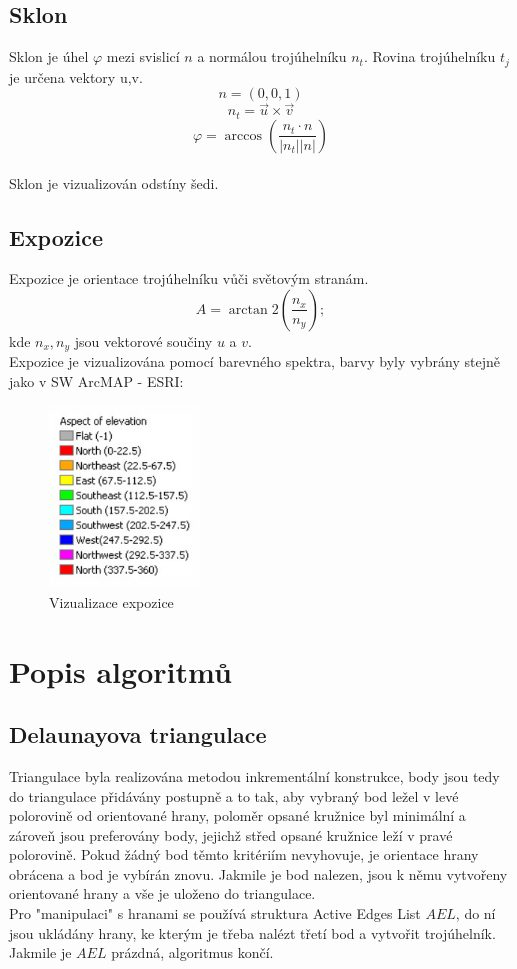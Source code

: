 \documentclass[a4paper, 12pt]{article}
\begin{document}
\subsection{Sklon}

Sklon je úhel $\varphi$ mezi svislicí $n$ a normálou trojúhelníku $n_t$. Rovina trojúhelníku $t_j$ je určena vektory u,v.\\

\noindent$$n = (0,0,1)$$
$$n_t = \vec{u}\times \vec{v}$$
$$\varphi =\arccos(\frac{n_t \cdot n}{|n_t| |n|})$$
\\
Sklon je vizualizován odstíny šedi.


\subsection{Expozice}
Expozice je orientace trojúhelníku vůči světovým stranám.\\
$$A = \arctan2(\frac{n_x}{n_y});$$ kde $n_x, n_y$ jsou vektorové součiny $u$ a $v$.\\

\noindent Expozice je vizualizována pomocí barevného spektra, barvy byly vybrány stejně jako v SW ArcMAP - ESRI:\\
\begin{figure}[h]
	\centering
	\includegraphics[width=4cm]{expozice.jpg}
	\caption{Vizualizace expozice}
\end{figure}


\clearpage
\section{Popis algoritmů}

\subsection{Delaunayova triangulace}
Triangulace byla realizována metodou inkrementální konstrukce, body jsou tedy do triangulace přidávány postupně a to tak, aby vybraný bod ležel v levé polorovině od orientované hrany, poloměr opsané kružnice byl minimální a zároveň jsou preferovány body, jejichž střed opsané kružnice leží v pravé polorovině. Pokud žádný bod těmto kritériím nevyhovuje, je orientace hrany obrácena a bod je vybírán znovu. Jakmile je bod nalezen, jsou k němu vytvořeny orientované hrany a vše je uloženo do triangulace.\\
Pro "manipulaci" s hranami se používá struktura Active Edges List $AEL$, do ní jsou ukládány hrany, ke kterým je třeba nalézt třetí bod a vytvořit trojúhelník. Jakmile je $AEL$ prázdná, algoritmus končí.
\end{document}
